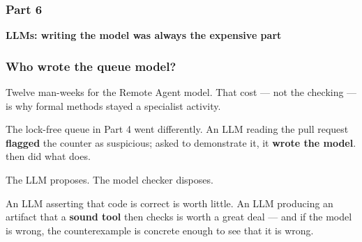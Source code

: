 \begin{frame}
  \frametitle{Part 6}

\iconllm[3.2]

\vspace{0.45cm}

{\Large\bf LLMs: writing the model was always the expensive part}

\end{frame}

\begin{frame}
  \frametitle{Who wrote the queue model?} \small

Twelve man-weeks for the Remote Agent model. That cost --- not the checking --- is
why formal methods stayed a specialist activity.

\pause
\vspace{0.3cm}

The lock-free queue in Part 4 went differently. An LLM reading the pull request
{\bf flagged} the counter as suspicious; asked to demonstrate it, it {\bf wrote the
\promelaname{} model}. \spin{} then did what \spin{} does.

\vspace{0.4cm}

{\centering
{}\par}

\pause
\vspace{0.3cm}

\begin{block}{}\small
\centering
The LLM proposes. The model checker disposes.
\end{block}

An LLM asserting that code is correct is worth little. An LLM producing an
artifact that a {\bf sound tool} then checks is worth a great deal --- and if the
model is wrong, the counterexample is concrete enough to see that it is wrong.

\end{frame}
